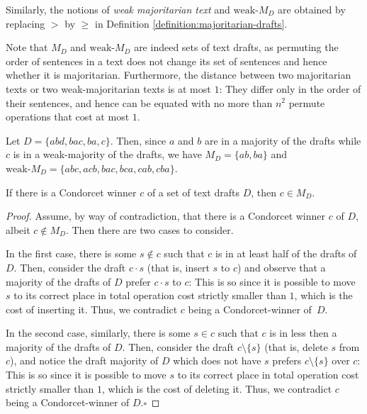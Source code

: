 \documentclass{llncs}
\newcommand{\qqed}{\hfill$\square$}
\begin{document}
Similarly, the notions of \emph{weak majoritarian text} and $\textrm{weak-}M_D$ are obtained by replacing $>$  by $\ge$ in Definition \ref{definition:majoritarian-drafts}.

Note that $M_D$ and $\textrm{weak-}M_D$ are indeed sets of text drafts, as permuting  the order of sentences in a text does not change its set of sentences and hence whether it is majoritarian. Furthermore, the distance between two majoritarian texts or two weak-majoritarian texts is at most $1$: They differ only in the order of their sentences, and hence can be equated with no more than $n^2$ permute operations that cost at most $1$.

\begin{example}
%
Let $D = \{abd, bac, ba, c\}$. Then, since $a$ and $b$ are in a majority of the drafts while $c$ is in a weak-majority of the drafts, we have $M_D = \{ab, ba\}$ and $\textrm{weak-}M_D = \{abc, acb, bac, bca, cab, cba\}$.
%
\end{example}

\begin{lemma}\label{lemma:cinmd}
  If there is a Condorcet winner $c$ of a set of text drafts $D$, then $c \in M_D$.
\end{lemma}

\begin{proof}
%
Assume, by way of contradiction, that there is a Condorcet winner $c$ of $D$, albeit $c \notin M_D$. Then there are two cases to consider.

In the first case, there is some $s \notin c$ such that $c$ is in at least half of the drafts of $D$. Then, consider the draft $c \cdot s$ (that is, insert $s$ to $c$) and observe that a majority of the drafts of $D$ prefer $c \cdot s$ to $c$:
  This is so since it is possible to move $s$ to its correct place in total operation cost strictly smaller than $1$, which is the cost of inserting it. Thus, we contradict $c$ being a Condorcet-winner of~$D$.

In the second case, similarly, there is some $s \in c$ such that $c$ is in less then a majority of the drafts of $D$. Then, consider the draft $c \setminus \{s\}$ (that is, delete $s$ from $c$), and notice the draft majority of $D$ which does not have $s$ prefers $c \setminus \{s\}$ over $c$:
  This is so since it is possible to move $s$ to its correct place in total operation cost strictly smaller than $1$, which is the cost of deleting it. Thus, we contradict $c$ being a Condorcet-winner of $D$.\qqed
%
\end{proof}
\end{document}
